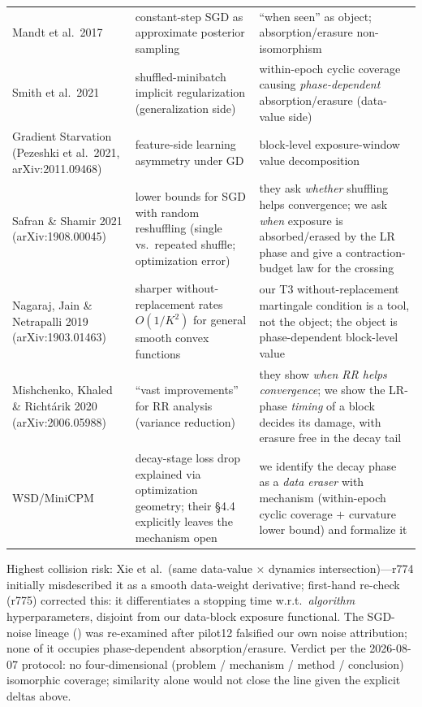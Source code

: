 \documentclass{article}
\begin{document}
\begin{center}
\begin{tabular}{@{}p{}p{}p{}@{}}
Mandt et al.\ 2017 \citep{mandt2017sgd} & constant-step SGD as approximate posterior
sampling & ``when seen'' as object; absorption/erasure non-isomorphism \\
Smith et al.\ 2021 \citep{smith2021origin} & shuffled-minibatch implicit regularization
(generalization side) & within-epoch cyclic coverage causing \emph{phase-dependent}
absorption/erasure (data-value side) \\
Gradient Starvation (Pezeshki et al.\ 2021, arXiv:2011.09468) & feature-side learning
asymmetry under GD & block-level exposure-window value decomposition \\
Safran \& Shamir 2021 (arXiv:1908.00045) & lower bounds for SGD with random reshuffling
(single vs.\ repeated shuffle; optimization error) & they ask \emph{whether} shuffling
helps convergence; we ask \emph{when} exposure is absorbed/erased by the LR phase and give a
contraction-budget law for the crossing \\
Nagaraj, Jain \& Netrapalli 2019 (arXiv:1903.01463) & sharper without-replacement rates
$O(1/K^2)$ for general smooth convex functions & our T3 without-replacement martingale
condition is a tool, not the object; the object is phase-dependent block-level value \\
Mishchenko, Khaled \& Richt\'arik 2020 (arXiv:2006.05988) & ``vast improvements'' for RR
analysis (variance reduction) & they show \emph{when RR helps convergence}; we show the
LR-phase \emph{timing} of a block decides its damage, with erasure free in the decay tail \\
WSD/MiniCPM \citep{hu2024minicpm} & decay-stage loss drop explained via optimization
geometry; their \S4.4 explicitly leaves the mechanism open & we identify the decay phase as a
\emph{data eraser} with mechanism (within-epoch cyclic coverage $+$ curvature lower bound)
and formalize it \\
\bottomrule
\end{tabular}
\end{center}

\noindent Highest collision risk: Xie et al.\ (same data-value $\times$ dynamics
intersection)---r774 initially misdescribed it as a smooth data-weight derivative;
first-hand re-check (r775) corrected this: it differentiates a stopping time w.r.t.\
\emph{algorithm} hyperparameters, disjoint from our data-block exposure functional. The
SGD-noise lineage (\citealp{smith2017bayesian,mandt2017sgd,smith2021origin}) was re-examined
after pilot12 falsified our own noise attribution; none of it occupies phase-dependent
absorption/erasure. Verdict per the 2026-08-07 protocol: no four-dimensional (problem /
mechanism / method / conclusion) isomorphic coverage; similarity alone would not close the
line given the explicit deltas above.
\end{document}
